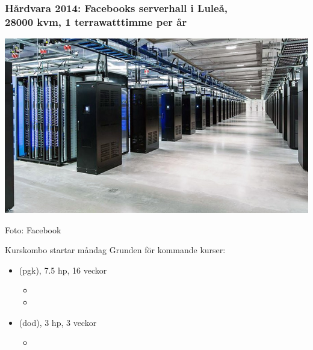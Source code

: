 \documentclass{lecturesimple}
\newcommand{\Startdag}{måndag}
\begin{document}
\begin{frame}\frametitle{Hårdvara 2014: Facebooks serverhall i Luleå, \\ 28000 kvm, 1 terrawatttimme per år}
  \begin{center}
    \includegraphics[width=1.05\textwidth]{../img/lulea-datacenter.jpg}
  
    {\fontsize{5}{5}\selectfont\color{gray}
  Foto: Facebook
  }
  \end{center}
\end{frame}

\begin{Slide}{Kurskombo startar \Startdag}
  Grunden för kommande kurser: \vspace{2em}
  \begin{itemize}
    \item {} (pgk), 7.5 hp, 16 veckor
    \begin{itemize}
      \item[]
      \item[]
    \end{itemize}
    \item {} (dod), 3 hp, 3 veckor
    \begin{itemize}
      \item[]
    \end{itemize}
  \end{itemize}
\end{Slide}
\end{document}
